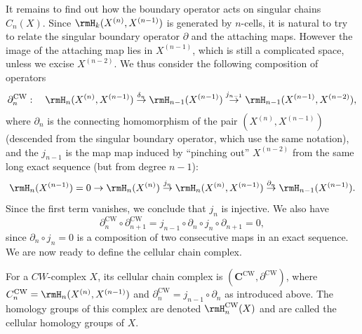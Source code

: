 It remains to find out how the boundary operator acts on singular chains $C_n(X)$. Since $\rmH_k(X^{(n)},X^{(n-1)})$ is generated by $n$-cells, it is natural to try to relate the singular boundary operator $\partial$ and the attaching maps. However the image of the attaching map lies in $X^{(n-1)}$, which is still a complicated space, unless we excise $X^{(n-2)}$. We thus consider the following composition of operators
\[\partial^{\mathrm{CW}}_n:\quad \rmH_n(X^{(n)},X^{(n-1)})\overset{\delta_n}{\to}\rmH_{n-1}(X^{(n-1)})\overset{j_{n-1}}{\to} \rmH_{n-1}(X^{(n-1)},X^{(n-2)}),\]
where $\partial_n$ is the connecting homomorphism of the pair $(X^{(n)},X^{(n-1)})$ (descended from the singular boundary operator, which use the same notation), and the $j_{n-1}$ is the map map induced by ``pinching out'' $X^{(n-2)}$ from the same long exact sequence (but from degree $n-1$):
\[\rmH_n(X^{(n-1)})=0\to \rmH_n(X^{(n)})\overset{j_n}{\to}\rmH_n(X^{(n)},X^{(n-1)})\overset{\partial_n}{\to}\rmH_{n-1}(X^{(n-1)}).\]
Since the first term vanishes, we conclude that $j_n$ is injective. We also have
\[\partial^{\mathrm{CW}}_n\circ \partial^{\mathrm{CW}}_{n+1}=j_{n-1}\circ \partial_n\circ j_n\circ \partial_{n+1}=0,\]
since $\partial_n\circ j_n=0$ is a composition of two consecutive maps in an exact sequence. We are now ready to define the cellular chain complex.

\begin{defn}
    For a $CW$-complex $X$, its cellular chain complex is $(\bm{C}^{\mathrm{CW}},\partial^{\mathrm{CW}})$, where $C_n^{\mathrm{CW}}=\rmH_n(X^{(n)},X^{(n-1)})$ and $\partial^{\mathrm{CW}}_n=j_{n-1}\circ \partial_n$ as introduced above. The homology groups of this complex are denoted $\rmH_n^{\mathrm{CW}}(X)$ and are called the cellular homology groups of $X$.
\end{defn}

